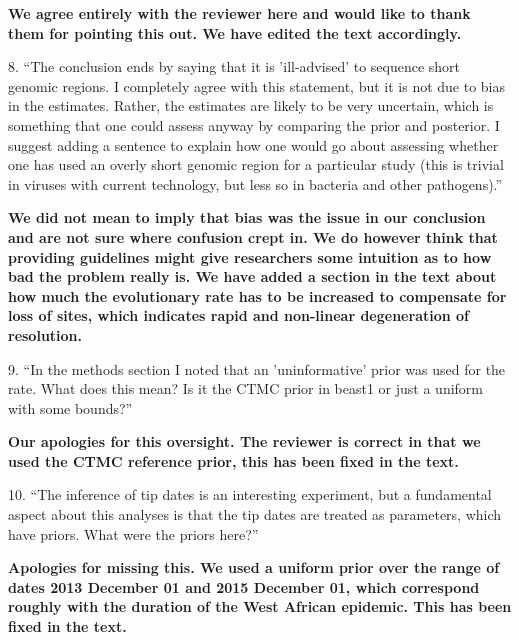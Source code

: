 \documentclass[11pt,oneside,letterpaper]{article}
\begin{document}
\textbf{We agree entirely with the reviewer here and would like to thank them for pointing this out. We have edited the text accordingly.}

8. ``The conclusion ends by saying that it is 'ill-advised' to sequence short genomic regions. I completely agree with this statement, but it is not due to bias in the estimates. Rather, the estimates are likely to be very uncertain, which is something that one could assess anyway by comparing the prior and posterior. I suggest adding a sentence to explain how one would go about assessing whether one has used an overly short genomic region for a particular study (this is trivial in viruses with current technology, but less so in bacteria and other pathogens).''

\textbf{We did not mean to imply that bias was the issue in our conclusion and are not sure where confusion crept in. We do however think that providing guidelines might give researchers some intuition as to how bad the problem really is. We have added a section in the text about how much the evolutionary rate has to be increased to compensate for loss of sites, which indicates rapid and non-linear degeneration of resolution.}

9. ``In the methods section I noted that an 'uninformative' prior was used for the rate. What does this mean? Is it the CTMC prior in beast1 or just a uniform with some bounds?''

\textbf{Our apologies for this oversight. The reviewer is correct in that we used the CTMC reference prior, this has been fixed in the text.}

10. ``The inference of tip dates is an interesting experiment, but a fundamental aspect about this analyses is that the tip dates are treated as parameters, which have priors. What were the priors here?''

\textbf{Apologies for missing this. We used a uniform prior over the range of dates 2013 December 01 and 2015 December 01, which correspond roughly with the duration of the West African epidemic. This has been fixed in the text.}
\end{document}
